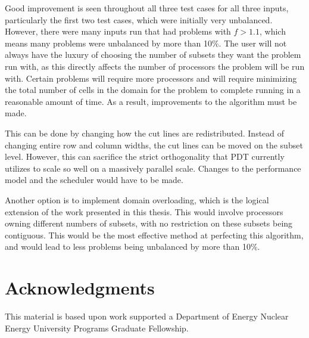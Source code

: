 \documentclass{anstrans}
\begin{document}
Good improvement is seen throughout all three test cases for all three inputs, particularly the first two test cases, which were initially very unbalanced. However, there were many inputs run that had problems with $f > 1.1$, which means many problems were unbalanced by more than 10\%. The user will not always have the luxury of choosing the number of subsets they want the problem run with, as this directly affects the number of processors the problem will be run with. Certain problems will require more processors and will require minimizing the total number of cells in the domain for the problem to complete running in a reasonable amount of time. As a result, improvements to the algorithm must be made. 

This can be done by changing how the cut lines are redistributed. Instead of changing entire row and column widths, the cut lines can be moved on the subset level. However, this can sacrifice the strict orthogonality that PDT currently utilizes to scale so well on a massively parallel scale. Changes to the performance model and the scheduler would have to be made.

Another option is to implement domain overloading, which is the logical extension of the work presented in this thesis. This would involve processors owning different numbers of subsets, with no restriction on these subsets being contiguous. This would be the most effective method at perfecting this algorithm, and would lead to less problems being unbalanced by more than 10\%.


\section{Acknowledgments}
This material is based upon work supported a Department of Energy Nuclear
Energy University Programs Graduate Fellowship.



\end{document}
